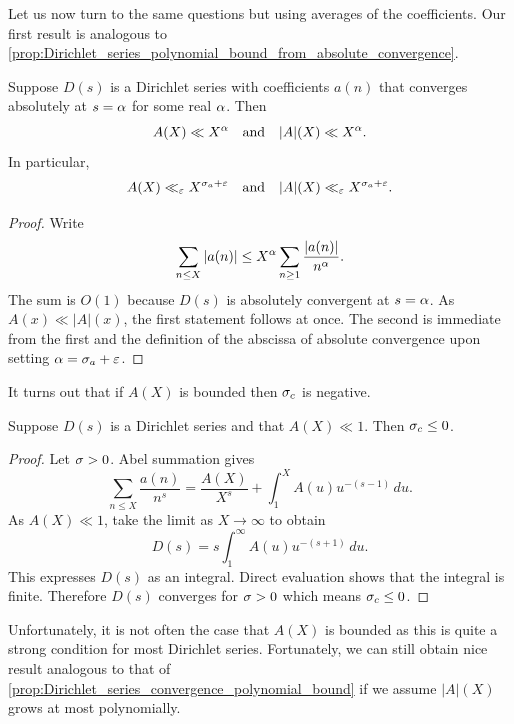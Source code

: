     Let us now turn to the same questions but using averages of the coefficients. Our first result is analogous to \cref{prop:Dirichlet_series_polynomial_bound_from_absolute_convergence}.

    \begin{proposition}\label{prop:Dirichlet_series_coefficient_size_on_average}
      Suppose \(D(s)\) is a Dirichlet series with coefficients \(a(n)\) that converges absolutely at \(s = \alpha\) for some real \(\alpha\). Then
      \[
        A(X) \ll X^{\alpha} \quad \text{and} \quad |A|(X) \ll X^{\alpha}.
      \]
      In particular,
      \[
        A(X) \ll_{\varepsilon} X^{\sigma_{a}+\varepsilon} \quad \text{and} \quad |A|(X) \ll_{\varepsilon} X^{\sigma_{a}+\varepsilon}.
      \]
    \end{proposition}
    \begin{proof}
      Write
      \[
        \sum_{n \le X}|a(n)| \le X^{\alpha}\sum_{n \ge 1}\frac{|a(n)|}{n^{\alpha}}.
      \]
      The sum is \(O(1)\) because \(D(s)\) is absolutely convergent at \(s = \alpha\). As \(A(x) \ll |A|(x)\), the first statement follows at once. The second is immediate from the first and the definition of the abscissa of absolute convergence upon setting \(\alpha = \sigma_{a}+\varepsilon\).
    \end{proof}
    
    It turns out that if \(A(X)\) is bounded then \(\sigma_{c}\) is negative.
    
    \begin{proposition}\label{prop:Dirichlet_series_convergence_bounded_coefficient_sum}
      Suppose \(D(s)\) is a Dirichlet series and that \(A(X) \ll 1\). Then \(\sigma_{c} \le 0\).
    \end{proposition}
    \begin{proof}
      Let \(\sigma > 0\). Abel summation gives
      \[
        \sum_{n \le X}\frac{a(n)}{n^{s}} = \frac{A(X)}{X^{s}}+\int_{1}^{X}A(u)u^{-(s-1)}\,du.
      \]
      As \(A(X) \ll 1\), take the limit as \(X \to \infty\) to obtain
      \[
        D(s) = s\int_{1}^{\infty}A(u)u^{-(s+1)}\,du.
      \]
      This expresses \(D(s)\) as an integral. Direct evaluation shows that the integral is finite. Therefore \(D(s)\) converges for \(\sigma > 0\) which means \(\sigma_{c} \le 0\).
    \end{proof}

    Unfortunately, it is not often the case that \(A(X)\) is bounded as this is quite a strong condition for most Dirichlet series. Fortunately, we can still obtain nice result analogous to that of \cref{prop:Dirichlet_series_convergence_polynomial_bound} if we assume \(|A|(X)\) grows at most polynomially.


